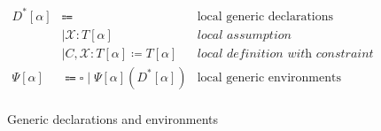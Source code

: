 \begin{figure}
\centering
\begin{align*}
D^*[\alpha] &\Coloneqq                                          &\text{local generic declarations} \\
    &\mid \mathcal{X}: T[\alpha]                                &\textit{local assumption} \\
    &\mid C, \mathcal{X}: T[\alpha] \coloneqq T[\alpha]         &\textit{local definition with constraint set} \\
\Psi[\alpha] &\Coloneqq \square \mid \Psi[\alpha] (D^*[\alpha]) &\text{local generic environments} \\
\end{align*}
\caption{Generic declarations and environments}
\label{fig:contexts-gen}
\end{figure}
